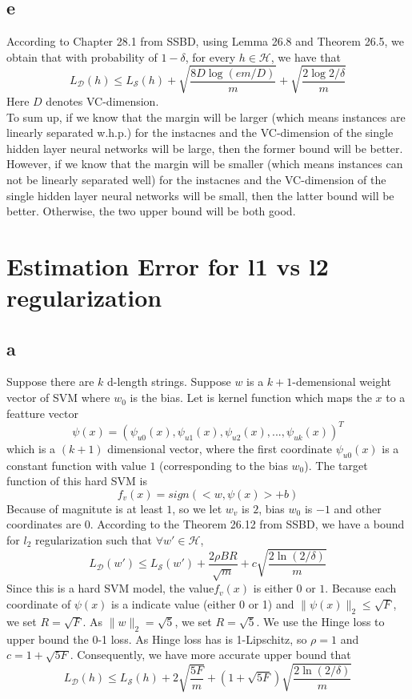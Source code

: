 \documentclass{article}
\begin{document}
	\subsection{e}
	According to Chapter 28.1 from SSBD, using Lemma 26.8 and Theorem 26.5, we obtain that with probability of $1-\delta$, for every $h \in \mathcal{H}$, we have that
	$$
	L_{\mathcal{D}}(h) \leq L_{\mathcal{S}}(h) + \sqrt{\frac{8D\log(em/D)}{m}} + \sqrt{\frac{2\log{2/\delta}}{m}}
	$$
	Here $D$ denotes VC-dimension.\\
	To sum up, if we know that the margin will be larger (which means instances are linearly separated w.h.p.) for the instacnes and the VC-dimension of the single hidden layer neural networks will be large, then the former bound will be better. However, if we know that the margin will be smaller (which means instances can not be linearly separated well) for the instacnes and the VC-dimension of the single hidden layer neural networks will be small, then the latter bound will be better. Otherwise, the two upper bound will be both good.

	\section{Estimation Error for l1 vs l2 regularization}
	\subsection{a}
	Suppose there are $k$ d-length strings. Suppose $w$ is a $k+1$-demensional weight vector of SVM where $w_0$ is the bias. Let is kernel function which maps the $x$ to a featture vector
	$$\psi(x)=(\psi_{u0}(x),\psi_{u1}(x),\psi_{u2}(x),...,\psi_{uk}(x))^T$$ 
	which is a $(k+1)$ dimensional vector, where the first coordinate $\psi_{u0}(x)$ is a constant function with value $1$ (corresponding to the bias $w_0$). 
	The target function of this hard SVM is 
	$$
	f_v(x) = sign(<w,\psi(x)>+b)
	$$
	Because of magnitute is at least $1$, so we let $w_{v}$ is $2$, bias $w_0$ is $-1$ and other coordinates are $0$. According to the Theorem 26.12 from SSBD, we have a bound for $l_2$ regularization such that $\forall w' \in \mathcal{H}$,
	$$
	L_{\mathcal{D}}(w') \leq L_{\mathcal{S}}(w')+\frac{2\rho BR}{\sqrt{m}}+c\sqrt{\frac{2\ln(2/\delta)}{m}}
	$$
	Since this is a hard SVM model, the value$f_v(x)$ is either $0$ or $1$. Because each coordinate of $\psi(x)$ is a indicate value (either 0 or 1) and $\|\psi(x)\|_2 \leq \sqrt{F}$, we set $R=\sqrt{F}$. As $\|w\|_2 = \sqrt{5}$, we set $R=\sqrt{5}$. We use the Hinge loss to upper bound the 0-1 loss. As Hinge loss has is 1-Lipschitz, so $\rho=1$ and $c=1+\sqrt{5F}$. Consequently, we have more accurate upper bound that
	$$
	L_{\mathcal{D}}(h) \leq L_{\mathcal{S}}(h) + 2\sqrt{\frac{5F}{m}}+(1+\sqrt{5F})\sqrt{\frac{2\ln(2/\delta)}{m}}
	$$
\end{document}
